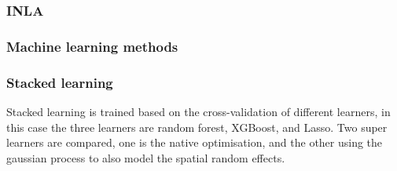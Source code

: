 \documentclass{article}
\begin{document}
\subsubsection{INLA}
\subsubsection{Machine learning methods}

\subsubsection{Stacked learning}
Stacked learning is trained based on the cross-validation of different learners, in this case the three learners are random forest, XGBoost, and Lasso. Two super learners are compared, one is the native optimisation, and the other using the gaussian process to also model the spatial random effects. 
\end{document}
